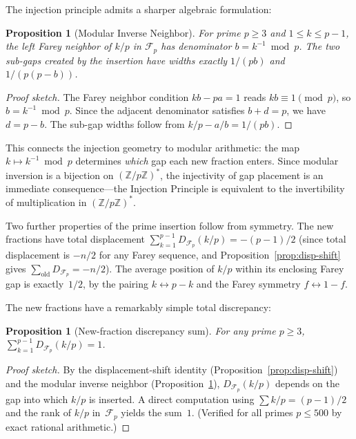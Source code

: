 \documentclass[11pt]{article}
\newtheorem{proposition}[theorem]{Proposition}
\theoremstyle{definition}
\newcommand{\Z}{\mathbb{Z}}
\newcommand{\F}{\mathcal{F}}
\begin{document}
The injection principle admits a sharper algebraic formulation:

\begin{proposition}[Modular Inverse Neighbor]\label{prop:mod-inv}
For prime $p \ge 3$ and $1 \le k \le p-1$, the left Farey neighbor
of $k/p$ in $\F_p$ has denominator $b = k^{-1} \bmod p$.  The two
sub-gaps created by the insertion have widths exactly $1/(pb)$ and
$1/(p(p-b))$.
\end{proposition}

\begin{proof}[Proof sketch]
The Farey neighbor condition $kb - pa = 1$ reads $kb \equiv 1 \pmod{p}$,
so $b = k^{-1} \bmod p$.  Since the adjacent denominator satisfies
$b + d = p$, we have $d = p - b$.  The sub-gap widths follow from
$k/p - a/b = 1/(pb)$.
\end{proof}

\noindent This connects the injection geometry to modular arithmetic:
the map $k \mapsto k^{-1} \bmod p$ determines \emph{which} gap
each new fraction enters.  Since modular inversion is a bijection
on $(\Z/p\Z)^*$, the injectivity of gap placement is an immediate
consequence---the Injection Principle is equivalent to the
invertibility of multiplication in $(\Z/p\Z)^*$.

Two further properties of the prime insertion follow from symmetry.
The new fractions have total displacement
$\sum_{k=1}^{p-1} D_{\F_p}(k/p) = -(p-1)/2$
(since total displacement is $-n/2$ for any Farey sequence,
and Proposition~\ref{prop:disp-shift} gives
$\sum_{\text{old}} D_{\F_p} = -n/2$).
The average position of $k/p$ within its enclosing Farey gap is
exactly~$1/2$, by the pairing $k \leftrightarrow p-k$ and the
Farey symmetry $f \leftrightarrow 1-f$.

The new fractions have a remarkably simple total discrepancy:

\begin{proposition}[New-fraction discrepancy sum]\label{prop:new-disp-sum}
For any prime $p \ge 3$,
$\sum_{k=1}^{p-1} D_{\F_p}(k/p) = 1$.
\end{proposition}

\begin{proof}[Proof sketch]
By the displacement-shift identity (Proposition~\ref{prop:disp-shift})
and the modular inverse neighbor (Proposition~\ref{prop:mod-inv}),
$D_{\F_p}(k/p)$ depends on the gap into which $k/p$ is inserted.
A direct computation using $\sum k/p = (p-1)/2$ and the
rank of $k/p$ in~$\F_p$ yields the sum~$1$.
(Verified for all primes $p \le 500$ by exact rational arithmetic.)
\end{proof}
\end{document}
